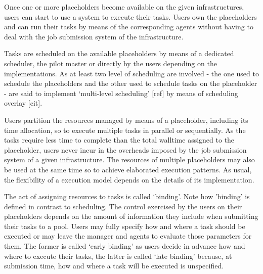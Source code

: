 \documentclass{sig-alternate}
\begin{document}
Once one or more placeholders become available on the given
infrastructures, users can start to use a \pilotjob system to execute
their tasks. Users own the placeholders and can run their tasks by
means of the corresponding agents without having to deal with the job
submission system of the infrastructure. 


Tasks are scheduled on the available placeholders by means of a
dedicated scheduler, the pilot master or directly by the users
depending on the \pilotjobs implementations. As at least two level of
scheduling are involved - the one used to schedule the placeholders
and the other used to schedule tasks on the placeholder - \pilotjobs
are said to implement `multi-level scheduling' [ref] by means of
scheduling overlay [cit].



Users partition the resources managed by means of a placeholder,
including its time allocation, so to execute multiple tasks in
parallel or sequentially. As the tasks require less time to complete
than the total walltime assigned to the placeholder, users never incur
in the overheads imposed by the job submission system of a given
infrastructure. The resources of multiple placeholders may also be
used at the same time so to achieve elaborated execution patterns. As
usual, the flexibility of a \pilotjob execution model depends on the
details of its implementation.



  The act of
assigning resources to tasks is called `binding'. Note how 'binding'
is defined in contrast to scheduling.    The control exercised by
the users on their placeholders depends on the amount of information
they include when submitting their tasks to a pool. Users may fully
specify how and where a task should be executed or may leave the
manager and agents to evaluate those parameters for them. The former
is called `early binding' as users decide in advance how and where to
execute their tasks, the latter is called `late binding' because, at
submission time, how and where a task will be executed is unspecified.
\end{document}
